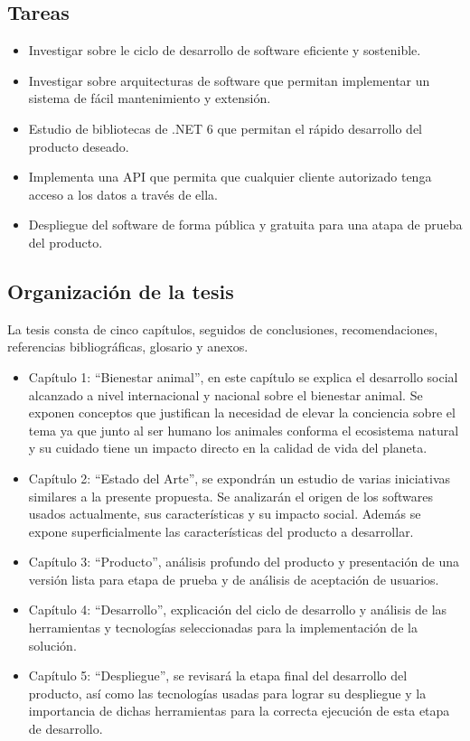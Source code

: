 \subsection*{Tareas}
\begin{itemize}
\item Investigar sobre le ciclo de desarrollo de software eficiente y sostenible.
\item Investigar sobre arquitecturas de software que permitan implementar un sistema de fácil mantenimiento y extensión.
\item Estudio de bibliotecas de .NET 6 que permitan el rápido desarrollo del producto deseado.
\item Implementa una API que permita que cualquier cliente autorizado tenga acceso a los datos a través de ella.
\item Despliegue del software de forma pública y gratuita para una atapa de prueba del producto.
\end{itemize}
\subsection*{Organizaci\'on de la tesis}
La tesis consta de cinco capítulos, seguidos de conclusiones, recomendaciones, referencias bibliográficas, glosario y anexos.
\begin{itemize}
\item Capítulo 1:  “Bienestar animal”, en este capítulo se explica el desarrollo social alcanzado a nivel internacional y nacional sobre el bienestar animal. Se exponen conceptos que justifican la necesidad de elevar la conciencia sobre el tema ya que junto al ser humano los animales conforma el ecosistema natural y su cuidado tiene un impacto directo en la calidad de vida del planeta.

\item Capítulo 2: “Estado del Arte”, se expondrán un estudio de varias iniciativas similares a la presente propuesta. Se analizarán el origen de los softwares usados actualmente, sus características y su impacto social. Además se expone superficialmente las características del producto a desarrollar.
\item Capítulo 3: “Producto”, análisis profundo del producto y presentación de una versión lista para etapa de prueba y de análisis de aceptación de usuarios. 
\item Capítulo 4: “Desarrollo”, explicación del ciclo de desarrollo y análisis de las herramientas y tecnologías seleccionadas para la implementación de la solución.

\item Capítulo 5: “Despliegue”, se revisará la etapa final del desarrollo del producto, así como las tecnologías usadas para lograr su despliegue y la importancia de dichas herramientas para la correcta ejecución de esta etapa de desarrollo.

\end{itemize}
